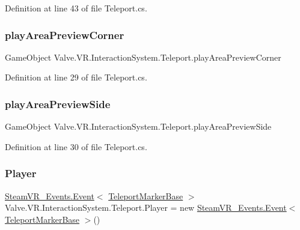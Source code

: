 Definition at line 43 of file Teleport.\+cs.

\mbox{\label{class_valve_1_1_v_r_1_1_interaction_system_1_1_teleport_aca4bac0a619126bf3d0f5e6406c28c9c}} 
\subsubsection{\texorpdfstring{playAreaPreviewCorner}{playAreaPreviewCorner}}
{\footnotesize\ttfamily Game\+Object Valve.\+V\+R.\+Interaction\+System.\+Teleport.\+play\+Area\+Preview\+Corner}



Definition at line 29 of file Teleport.\+cs.

\mbox{\label{class_valve_1_1_v_r_1_1_interaction_system_1_1_teleport_aef7189c52eb6539ed4178c06b1eb31f1}} 
\subsubsection{\texorpdfstring{playAreaPreviewSide}{playAreaPreviewSide}}
{\footnotesize\ttfamily Game\+Object Valve.\+V\+R.\+Interaction\+System.\+Teleport.\+play\+Area\+Preview\+Side}



Definition at line 30 of file Teleport.\+cs.

\mbox{\label{class_valve_1_1_v_r_1_1_interaction_system_1_1_teleport_af8a6ad3703a4ee9ca1ea630058f5f92f}} 
\subsubsection{\texorpdfstring{Player}{Player}}
{\footnotesize\ttfamily \mbox{\hyperlink{class_valve_1_1_v_r_1_1_steam_v_r___events_1_1_event}{Steam\+V\+R\+\_\+\+Events.\+Event}}$<$ \mbox{\hyperlink{class_valve_1_1_v_r_1_1_interaction_system_1_1_teleport_marker_base}{Teleport\+Marker\+Base}} $>$ Valve.\+V\+R.\+Interaction\+System.\+Teleport.\+Player = new \mbox{\hyperlink{class_valve_1_1_v_r_1_1_steam_v_r___events_1_1_event}{Steam\+V\+R\+\_\+\+Events.\+Event}}$<$ \mbox{\hyperlink{class_valve_1_1_v_r_1_1_interaction_system_1_1_teleport_marker_base}{Teleport\+Marker\+Base}} $>$()\hspace{0.3cm}{\ttfamily [static]}}



